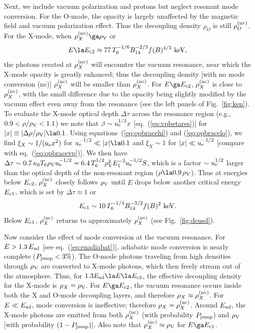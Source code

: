 \documentclass{mn2e}
\newcommand{\be}{\begin{equation}}
\newcommand{\ee}{\end{equation}}
\newcommand{\polarb}{\beta}
\newcommand{\uel}{u_{\rm e}}
\newcommand{\opbrace}{\xi}
\newcommand{\densvp}{\rho_{\rm V}}
\begin{document}
{Next, we include vacuum polarization and protons but neglect resonant
mode conversion.  For the O-mode, the opacity is largely unaffected
by the magnetic field and vacuum polarization effect.  Thus the
decoupling density $\rho_O$ is still $\rho_O^{(\rm nv)}$.
For the X-mode, when $\rho_X^{(\rm nv)}\ga\densvp$ or
\be
E\la E_{\rm c2} \approx 77\,T_6^{-1/6}B_{14}^{-2/3}f(B)^{4/3}\mbox{ keV},
 \label{eq:ec2}
\ee
the photons created at $\rho_X^{(\rm nv)}$ will encounter the
vacuum resonance, near which the X-mode opacity is greatly enhanced;
thus the decoupling density [with no mode conversion (nc)]
$\rho_X^{(\rm nc)}$ will be smaller than $\rho_X^{(\rm nv)}$.
For $E\ga E_{\rm c2}$, $\rho_X^{(\rm nc)}$ is close to $\rho_X^{(\rm nv)}$,
with the small difference due to the opacity being slightly modified
by the vacuum effect even away from the resonance (see the left panels of
Fig.~\ref{fig:ken}).
To evaluate the X-mode optical depth $\Delta\tau$ across the resonance
region (e.g., $0.9 < \rho/\densvp < 1.1$) we note that
$\polarb\sim\uel^{1/2}x$ [eq.~(\ref{eq:vpbetares})]
for $|x|\equiv|\Delta\rho/\densvp|\la 0.1$.
Using equations~(\ref{eq:opbracehi}) and (\ref{eq:opbracelo}),
we find $\opbrace_X\sim 1/(\uel x^2)$ for $\uel^{-1/2}\ll|x|\la 0.1$
and $\opbrace_X\sim 1$ for $|x|\ll\uel^{-1/2}$
[compare with eq.~(\ref{eq:opbracevp})].
We then have $\Delta\tau\sim 0.7\,\kappa_0T_6\densvp\uel^{-1/2}
=6.4\,T_6^{1/2}\densvp^2E_1^{-3}\uel^{-1/2}S$,
which is a factor $\sim\uel^{1/2}$ larger than the optical depth
of the non-resonant region ($\rho\la 0.9\,\densvp$).
Thus at energies below $E_{\rm c2}$, $\rho_X^{(\rm nc)}$
closely follows $\densvp$ until $E$ drops below another
critical energy $E_{\rm c1}$, which is set by $\Delta\tau\approx 1$ or
\be
E_{\rm c1} \sim 10\,T_6^{-1/4}B_{14}^{-3/2}f(B)^2\mbox{ keV}.  \label{eq:ec1}
\ee
Below $E_{\rm c1}$, $\rho_X^{(\rm nc)}$ returns to approximately
$\rho_X^{(\rm nv)}$ (see Fig.~\ref{fig:densd}).

Now consider the effect of mode conversion at the vacuum resonance.
For $E>1.3\,E_{\rm ad}$ [see eq.~(\ref{eq:enadiabat})], adiabatic mode
conversion is nearly complete ($P_{\rm jump} < 3\%$).  The O-mode
photons traveling from high densities through $\densvp$ are
converted to X-mode photons, which then freely stream out of the
atmosphere.  Thus, for $1.3 E_{\rm ad}\la E\la E_{\rm c2}$, the
effective decoupling density for the X-mode is $\rho_X=\densvp$.
For $E\ga E_{\rm c2}$, the vacuum resonance occurs inside both
the X and O-mode decoupling layers, and therefore
$\rho_X\approx\rho_X^{(\rm nv)}$.  For $E\ll E_{\rm ad}$, mode
conversion is ineffective; therefore $\rho_X=\rho_X^{(\rm nc)}$.
Around $E_{\rm ad}$, the X-mode photons are emitted from both
$\rho_X^{(\rm nc)}$ (with probability $P_{\rm jump}$) and
$\densvp$ [with probability $(1-P_{\rm jump})$].
Also note that $\rho_X^{(\rm nc)}\approx\densvp$ for $E\ga E_{\rm c1}$.

}
\end{document}
